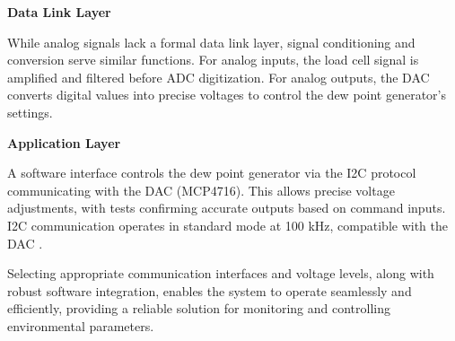 \textbf{Data Link Layer}

While analog signals lack a formal data link layer, signal conditioning and conversion serve similar functions. For analog inputs, the load cell signal is amplified and filtered before ADC digitization. For analog outputs, the DAC converts digital values into precise voltages to control the dew point generator's settings.

\textbf{Application Layer}

A software interface controls the dew point generator via the I2C protocol communicating with the DAC (MCP4716). This allows precise voltage adjustments, with tests confirming accurate outputs based on command inputs. I2C communication operates in standard mode at 100 kHz, compatible with the DAC \cite{DAC_datasheet}.

Selecting appropriate communication interfaces and voltage levels, along with robust software integration, enables the system to operate seamlessly and efficiently, providing a reliable solution for monitoring and controlling environmental parameters.

